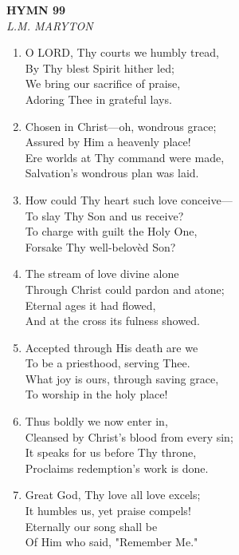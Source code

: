\newpage
\begin{center}
    {\Large \textbf{HYMN 99\textdagger{}}}
    \\
    \textit{L.M. MARYTON}
\end{center}
\vspace{1em}

\begin{enumerate}
    \item O LORD, Thy courts we humbly tread, \\
        By Thy blest Spirit hither led; \\
        We bring our sacrifice of praise, \\
        Adoring Thee in grateful lays.

    \item Chosen in Christ---oh, wondrous grace; \\
        Assured by Him a heavenly place! \\
        Ere worlds at Thy command were made, \\
        Salvation's wondrous plan was laid.

    \item How could Thy heart such love conceive--- \\
        To slay Thy Son and us receive? \\
        To charge with guilt the Holy One, \\
        Forsake Thy well-belov\`ed Son?

    \item The stream of love divine alone \\
        Through Christ could pardon and atone; \\
        Eternal ages it had flowed, \\
        And at the cross its fulness showed.

    \item Accepted through His death are we \\
        To be a priesthood, serving Thee. \\
        What joy is ours, through saving grace, \\
        To worship in the holy place!

    \item Thus boldly we now enter in, \\
        Cleansed by Christ's blood from every sin; \\
        It speaks for us before Thy throne, \\
        Proclaims redemption's work is done.

    \item Great God, Thy love all love excels; \\
        It humbles us, yet praise compels! \\
        Eternally our song shall be \\
        Of Him who said, "Remember Me."

\end{enumerate}

